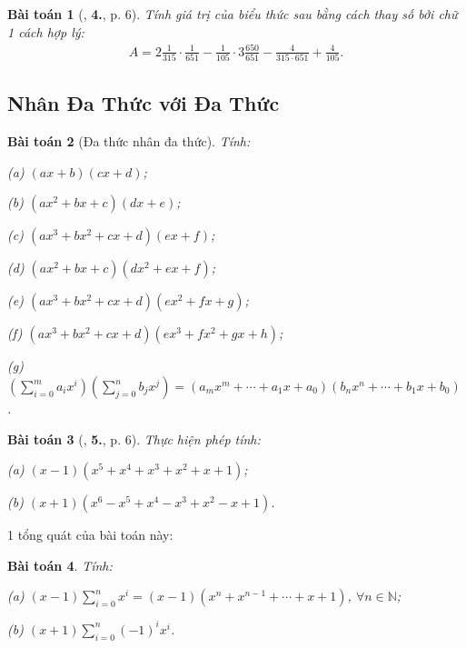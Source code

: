 \documentclass{article}
\numberwithin{equation}{section}
\newtheorem{baitoan}{Bài toán}[section]
\begin{document}
\begin{baitoan}[\cite{Binh_Toan_8_tap_1}, \textbf{4.}, p. 6]
	Tính giá trị của biểu thức sau bằng cách thay số bởi chữ 1 cách hợp lý:
	\begin{align*}
		A = 2\frac{1}{315}\cdot\frac{1}{651} - \frac{1}{105}\cdot 3\frac{650}{651} - \frac{4}{315\cdot 651} + \frac{4}{105}.
	\end{align*}
\end{baitoan}


\subsection{Nhân Đa Thức với Đa Thức}
\begin{baitoan}[Đa thức nhân đa thức]
	Tính:
	\begin{enumerate*}
		\item[(a)] $(ax + b)(cx + d)$;
		\item[(b)] $(ax^2 + bx + c)(dx + e)$;
		\item[(c)] $(ax^3 + bx^2 + cx + d)(ex + f)$;
		\item[(d)] $(ax^2 + bx + c)(dx^2 + ex + f)$;
		\item[(e)] $(ax^3 + bx^2 + cx + d)(ex^2 + fx + g)$;
		\item[(f)] $(ax^3 + bx^2 + cx + d)(ex^3 + fx^2 + gx + h)$;
		\item[(g)] $\left(\sum_{i=0}^m a_ix^i\right)\left(\sum_{j=0}^n b_jx^j\right) = (a_mx^m + \cdots + a_1x + a_0)(b_nx^n + \cdots + b_1x + b_0)$.
	\end{enumerate*}
\end{baitoan}

\begin{baitoan}[\cite{Binh_Toan_8_tap_1}, \textbf{5.}, p. 6]
	Thực hiện phép tính:
	\begin{enumerate*}
		\item[(a)] $(x - 1)(x^5 + x^4 + x^3 + x^2 + x + 1)$;
		\item[(b)] $(x + 1)(x^6 - x^5 + x^4 - x^3 + x^2 - x + 1)$.
	\end{enumerate*}
\end{baitoan}
1 tổng quát của bài toán này:

\begin{baitoan}
	Tính:
	\begin{enumerate*}
		\item[(a)] $(x - 1)\sum_{i=0}^n x^i = (x - 1)(x^n + x^{n-1} + \cdots + x + 1)$, $\forall n\in\mathbb{N}$;
		\item[(b)] $(x + 1)\sum_{i=0}^n (-1)^ix^i$.
	\end{enumerate*}
\end{baitoan}
\end{document}
